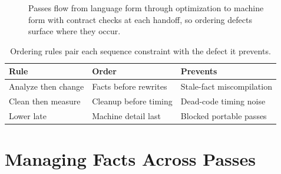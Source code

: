 \begin{figure}[htbp]
\centering
{}
\caption{Passes flow from language form through optimization to machine form with contract checks at each handoff, so ordering defects surface where they occur.}
\label{fig:ch38-pipeline}
\end{figure}

\begin{table}[htbp]
\centering
\caption{Ordering rules pair each sequence constraint with the defect it prevents.}
\label{tab:ch38-ordering}
\begin{tabular}{lll}
\toprule
Rule & Order & Prevents \\
\midrule
Analyze then change & Facts before rewrites & Stale-fact miscompilation \\
Clean then measure & Cleanup before timing & Dead-code timing noise \\
Lower late & Machine detail last & Blocked portable passes \\
\bottomrule
\end{tabular}
\end{table}

\section{Managing Facts Across Passes}\label{sec:ch38-facts}

